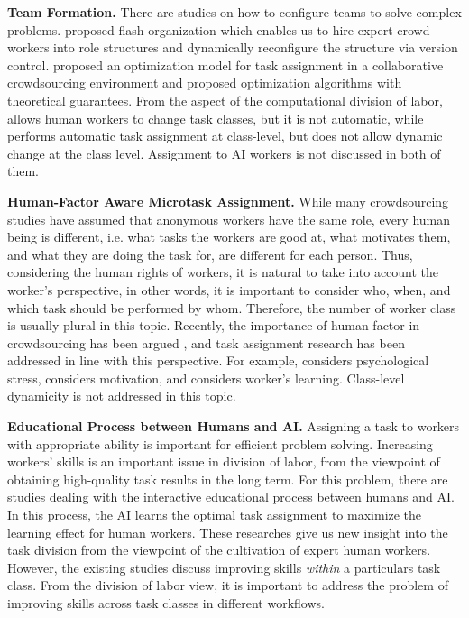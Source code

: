 \noindent
{\bf Team Formation.}
There are studies on how to configure teams to solve complex problems.
\cite{VRT+17} proposed flash-organization which enables us to hire expert crowd workers into role structures and dynamically reconfigure the structure via version control.
\cite{RRT+19} proposed an optimization model for task assignment in a collaborative crowdsourcing environment and proposed optimization algorithms with theoretical guarantees.
From the aspect of the computational division of labor, \cite{VRT+17} allows  human workers to change task classes, but it is not automatic, while \cite{RRT+19} performs automatic task assignment at class-level, but does not allow dynamic change at the class level. Assignment to AI workers is not discussed in both of them.

\noindent
{\bf Human-Factor Aware Microtask Assignment.}
While many crowdsourcing studies have assumed that anonymous workers have the same role, every human being is different, i.e. what tasks the workers are good at, what motivates them, and what they are doing the task for, are different for each person.
Thus, considering the human rights of workers, it is natural to take into account the worker's perspective, in other words, it is important to consider who, when, and which task should be performed by whom. Therefore, the number of worker class is usually plural in this topic.
Recently, the importance of human-factor in crowdsourcing has been argued \cite{AR16}, and task assignment research has been addressed in line with this perspective. For example, \cite{KMM+18} considers psychological stress, \cite{PAS+18} considers motivation, and \cite{SSL+16} considers worker's learning.
Class-level dynamicity is not addressed in this topic.

\noindent
{\bf Educational Process between Humans and AI.}
Assigning a task to workers with appropriate ability is important for efficient problem solving.
Increasing workers' skills is an important issue in division of labor,  from the viewpoint of obtaining high-quality task results in the long term.
For this problem, there are studies dealing with the interactive educational process between humans and AI.
In this process, the AI learns the optimal task assignment to maximize the learning effect for human workers.
These researches give us new insight into the task division from the viewpoint of the cultivation of expert human workers.
However, the existing studies discuss improving skills {\it within} a particulars task class. 
From the division of labor view, it is important to address the problem of  improving skills across task classes in different workflows.  


